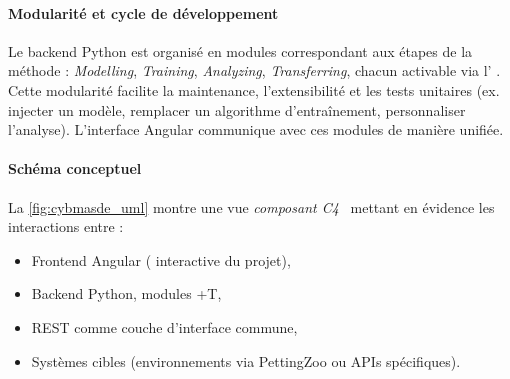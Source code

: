 \paragraph{Modularité et cycle de développement}
Le backend Python est organisé en modules correspondant aux étapes de la méthode  :
\textit{Modelling}, \textit{Training}, \textit{Analyzing}, \textit{Transferring}, chacun activable via l' .
Cette modularité facilite la maintenance, l'extensibilité et les tests unitaires (ex. injecter un modèle, remplacer un algorithme d'entraînement, personnaliser l'analyse). L'interface Angular communique avec ces modules de manière unifiée.

\paragraph{Schéma conceptuel}
La \autoref{fig:cybmasde_uml} montre une vue \textit{composant C4}~\cite{richards2019fundamentals} mettant en évidence les interactions entre :
\begin{itemize}
  \item \textsf{Frontend Angular} ( interactive du projet),
  \item \textsf{Backend Python}, modules +T,
  \item \textsf{ REST} comme couche d'interface commune,
  \item \textsf{Systèmes cibles} (environnements via PettingZoo ou APIs spécifiques).
\end{itemize}

